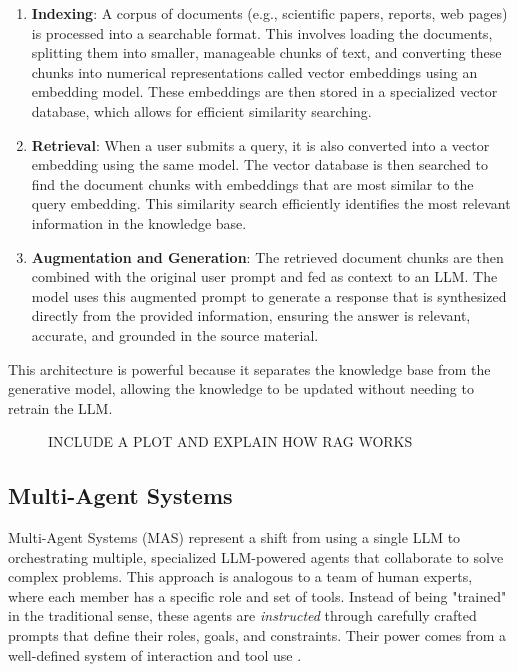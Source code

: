 \begin{enumerate}
    \item \textbf{Indexing}: A corpus of documents (e.g., scientific papers, reports, web pages) is processed into a searchable format. This involves loading the documents, splitting them into smaller, manageable chunks of text, and converting these chunks into numerical representations called vector embeddings using an embedding model. These embeddings are then stored in a specialized vector database, which allows for efficient similarity searching.
    \item \textbf{Retrieval}: When a user submits a query, it is also converted into a vector embedding using the same model. The vector database is then searched to find the document chunks with embeddings that are most similar to the query embedding. This similarity search efficiently identifies the most relevant information in the knowledge base.
    \item \textbf{Augmentation and Generation}: The retrieved document chunks are then combined with the original user prompt and fed as context to an LLM. The model uses this augmented prompt to generate a response that is synthesized directly from the provided information, ensuring the answer is relevant, accurate, and grounded in the source material.
\end{enumerate}

This architecture is powerful because it separates the knowledge base from the generative model, allowing the knowledge to be updated without needing to retrain the LLM.

\begin{figure}[h]
    \centering
    \label{fig:rag_diagram}
    INCLUDE A PLOT AND EXPLAIN HOW RAG WORKS
\end{figure}

\subsection{Multi-Agent Systems}
Multi-Agent Systems (MAS) represent a shift from using a single LLM to orchestrating multiple, specialized LLM-powered agents that collaborate to solve complex problems. This approach is analogous to a team of human experts, where each member has a specific role and set of tools. Instead of being "trained" in the traditional sense, these agents are \textit{instructed} through carefully crafted prompts that define their roles, goals, and constraints. Their power comes from a well-defined system of interaction and tool use \cite{han_llm_2025}.\\

